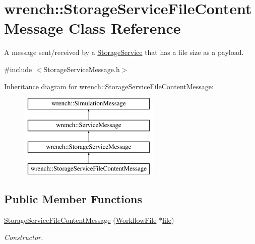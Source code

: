 \hypertarget{classwrench_1_1_storage_service_file_content_message}{}\section{wrench\+:\+:Storage\+Service\+File\+Content\+Message Class Reference}
\label{classwrench_1_1_storage_service_file_content_message}


A message sent/received by a \hyperlink{classwrench_1_1_storage_service}{Storage\+Service} that has a file size as a payload.  




{\ttfamily \#include $<$Storage\+Service\+Message.\+h$>$}

Inheritance diagram for wrench\+:\+:Storage\+Service\+File\+Content\+Message\+:\begin{figure}[H]
\begin{center}
\leavevmode
\includegraphics[height=4.000000cm]{classwrench_1_1_storage_service_file_content_message}
\end{center}
\end{figure}
\subsection*{Public Member Functions}
\begin{DoxyCompactItemize}
\item 
\hyperlink{classwrench_1_1_storage_service_file_content_message_a9994d2e7b1cc0358a2f971730c437ee4}{Storage\+Service\+File\+Content\+Message} (\hyperlink{classwrench_1_1_workflow_file}{Workflow\+File} $\ast$\hyperlink{classwrench_1_1_storage_service_file_content_message_a8bef9d31c075e0dc9b28cbcfcc31eaf3}{file})
\begin{DoxyCompactList}\small\item\em Constructor. \end{DoxyCompactList}\end{DoxyCompactItemize}
